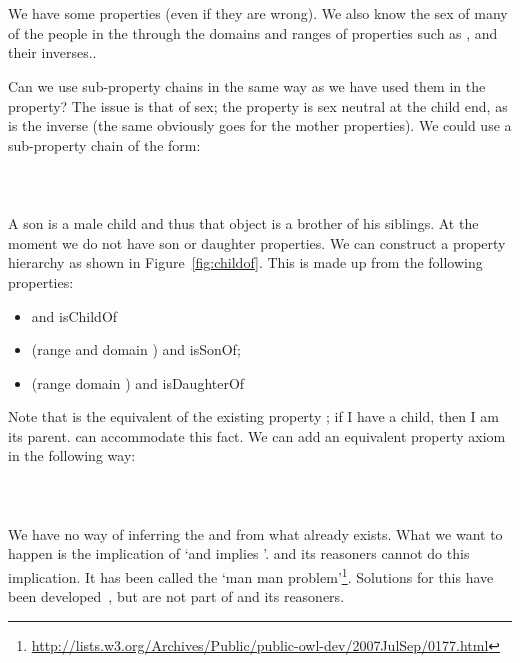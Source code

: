 
\\\\
We have some  properties (even if they are wrong). We also know the sex of many of the people in the \fhkb through the domains and ranges of properties such as ,  and their inverses.. 

Can we use sub-property chains in the same way as we have used them in the  property? The issue is that of sex; the property  is sex neutral at the child end, as is the inverse  (the same obviously goes for the mother properties). We could use a sub-property chain of the form:
\\\\
\\\\
A son is a male child and thus that object is a brother of his siblings. At the moment we do not have son or daughter properties. We can construct a property hierarchy as shown in Figure~\ref{fig:childof}. This is made up from the following properties:
\begin{itemize}
\item {} and isChildOf 
\item {} (range \man and domain \person) and isSonOf;
\item {} (range \woman domain \person) and isDaughterOf
\end{itemize}
Note that  is the equivalent of the existing property ; if I have a child, then I am its parent. \owlii can accommodate this fact. We can add an equivalent property axiom in the following way:
\\\\
\\
\\
We have no way of inferring the  and  from what already exists. What we want to happen is the implication of `\man and  \person implies '. \owlii and its reasoners cannot do this implication. It has been called the `man man problem'\footnote{\url{http://lists.w3.org/Archives/Public/public-owl-dev/2007JulSep/0177.html}}. Solutions for this have been developed~\cite{manMan09}, but are not part of \owlii and its reasoners.

